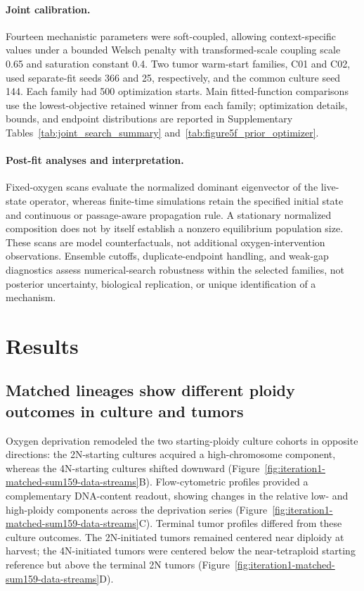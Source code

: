 \documentclass[11pt]{article}
\begin{document}
\paragraph{Joint calibration.}
Fourteen mechanistic parameters were soft-coupled, allowing context-specific values under a bounded Welsch penalty with transformed-scale coupling scale 0.65 and saturation constant 0.4. Two tumor warm-start families, C01 and C02, used separate-fit seeds 366 and 25, respectively, and the common culture seed 144. Each family had 500 optimization starts. Main fitted-function comparisons use the lowest-objective retained winner from each family; optimization details, bounds, and endpoint distributions are reported in Supplementary Tables~\ref{tab:joint_search_summary} and~\ref{tab:figure5f_prior_optimizer}.

\paragraph{Post-fit analyses and interpretation.}
Fixed-oxygen scans evaluate the normalized dominant eigenvector of the live-state operator, whereas finite-time simulations retain the specified initial state and continuous or passage-aware propagation rule. A stationary normalized composition does not by itself establish a nonzero equilibrium population size. These scans are model counterfactuals, not additional oxygen-intervention observations. Ensemble cutoffs, duplicate-endpoint handling, and weak-gap diagnostics assess numerical-search robustness within the selected families, not posterior uncertainty, biological replication, or unique identification of a mechanism.

\section*{Results}

\subsection*{Matched lineages show different ploidy outcomes in culture and tumors}

Oxygen deprivation remodeled the two starting-ploidy culture cohorts in opposite directions: the 2N-starting cultures acquired a high-chromosome component, whereas the 4N-starting cultures shifted downward (Figure~\ref{fig:iteration1-matched-sum159-data-streams}B). Flow-cytometric profiles provided a complementary DNA-content readout, showing changes in the relative low- and high-ploidy components across the deprivation series (Figure~\ref{fig:iteration1-matched-sum159-data-streams}C). Terminal tumor profiles differed from these culture outcomes. The 2N-initiated tumors remained centered near diploidy at harvest; the 4N-initiated tumors were centered below the near-tetraploid starting reference but above the terminal 2N tumors (Figure~\ref{fig:iteration1-matched-sum159-data-streams}D).
\end{document}
